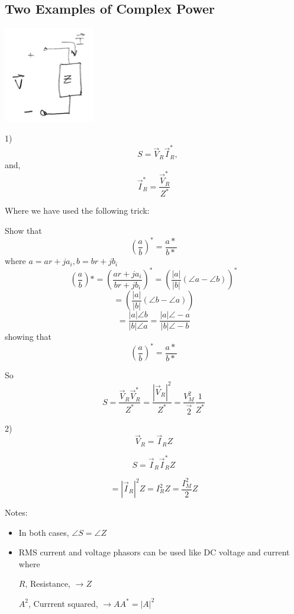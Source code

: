 \subsection{Two Examples of Complex Power}

\includegraphics[width=0.3\textwidth]{figsChapt03/MB87549.png}

1)
\[
 \quad S = \vec{V}_R \vec{I}_R^*,
\]
and,
\[
\vec{I}_R^* = \frac{\vec{V}_R^*}{Z^*}
\]

\begin{ExampleSmall}
Where we have used the following trick:

\noindent
Show that
\[
\left (\frac {a}  {b}\right )^*  =  \frac {a*}  {b*}
\]
where $a = ar+ja_i, b = br+jb_i$
\[
\left (\frac {a}  {b}\right )*  =  \left (\frac {ar+j a_i}  {br+jb_i} \right )^* =
\left (\frac {|a|}  {|b|} (\angle a - \angle b) \right )^*
\]
\[
= \left (\frac {|a|}  {|b|} (\angle b - \angle a) \right )
\]
\[
=\frac {|a|\angle b}  {|b|\angle a}
=\frac {|a|\angle -a}  {|b|\angle -b}
\]
showing that
\[
\left (\frac {a}  {b}\right )^*  =  \frac {a*}  {b*}
\]
\end{ExampleSmall}
\vspace{0.25in}

So
\[
S = \frac{\vec{V}_R \vec{V}_R^*}{Z^*} = \frac{|\vec{V}_R|^2}{Z^*} = \frac{V_M^2}{\vec{2}}\frac{1}{Z^*}
\]

2)
\[
\vec{V}_R = \vec{I}_R Z
\]

\[
S = \vec I_R \vec I_R^* Z
\]

\[
= |\vec{I}_R|^2 {Z} = I_R^2 {Z} = \frac{I_M^2}{2} {Z}
\]

Notes:
\begin{itemize}
\item In both cases, $\angle S = \angle Z$

\item RMS current and voltage phasors can be used like DC voltage and current where

$R$, Resistance, $ \rightarrow Z$

$A^2$, Currrent squared, $ \rightarrow A A^* = |A|^2$
\end{itemize}

